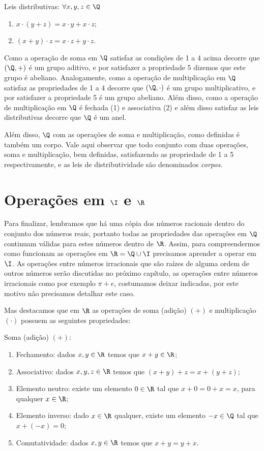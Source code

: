   Leis distributivas: $\forall x, y, z \in \Q$
 \begin{enumerate}[1)]
 \item $x \cdot (y + z)= x \cdot y + x \cdot z$;
 \item $(x + y) \cdot z= x \cdot z + y \cdot z$.
 \end{enumerate}

  Como a operação de soma em $\Q$ satisfaz as condições de 1 a 4 acima decorre que $(\Q, +)$ é um grupo aditivo, e por satisfazer a propriedade 5 dizemos que este grupo é abeliano. Analogamente, como a operação de multiplicação em $\Q$ satisfaz as propriedades de 1 a 4 decorre que $(\Q, \cdot)$ é um grupo multiplicativo, e por satisfazer a propriedade 5 é um grupo abeliano. Além disso, como a operação de multiplicação em $\Q$ é fechada (1) e associativa (2) e além disso satisfaz as leis distributivas decorre que $\Q$ é um anel.

  Além disso, $\Q$ com as operações de soma e multiplicação, como definidas é também um corpo. Vale aqui observar que todo conjunto com duas operações, soma e multiplicação, bem definidas, satisfazendo as propriedade de 1 a 5 respectivamente, e as leis de distributividade são denominados \emph{corpos}.

 \section{Operações em \texorpdfstring{$\I$}{I} e \texorpdfstring{$\R$}{R}}

 Para finalizar, lembramos que há uma cópia dos números racionais dentro do conjunto dos números reais, portanto todas as propriedades das operações em $\Q$ continuam válidas para estes números dentro de $\R$. Assim, para compreendermos como funcionam as operações em $\R= \Q \cup \I$ precisamos aprender a operar em $\I$. As operações entre números irracionais que são raízes de alguma ordem de outros números serão discutidas no próximo capítulo, as operações entre números irracionais como por exemplo $\pi + e$, costumamos deixar indicadas, por este motivo não precisamos detalhar este caso.

 Mas destacamos que em $\R$ as operações de soma (adição) $(+)$ e multiplicação $(\cdot)$ possuem as seguintes propriedades:

 Soma (adição) $(+)$:
 \begin{enumerate}[1)]
 \item Fechamento: dados $x, y \in \R$ temos que $x+y \in \R$;
 \item Associativo: dados $x, y, z \in \R$ temos que $(x+y)+z= x+(y+z)$;
 \item Elemento neutro: existe um elemento $0 \in \R$ tal que $x+0=0+x=x$, para qualquer $x \in \R$;
 \item Elemento inverso: dado $x \in \R$ qualquer, existe um elemento $-x \in \Q$ tal que $x+(-x)=0$;
 \item Comutatividade: dados $x, y \in \R$ temos que $x+y= y+x$.
 \end{enumerate}

